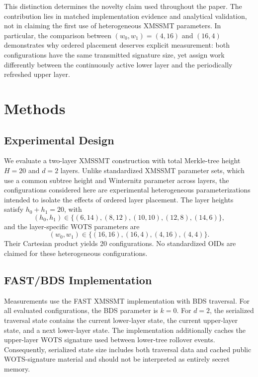 \documentclass[pdflatex,sn-mathphys-num]{sn-jnl}
\begin{document}
This distinction determines the novelty claim used throughout the paper.
The contribution lies in matched implementation evidence and analytical
validation, not in claiming the first use of heterogeneous XMSSMT
parameters. In particular, the comparison between $(w_0,w_1)=(4,16)$
and $(16,4)$ demonstrates why ordered placement deserves explicit
measurement: both configurations have the same transmitted signature
size, yet assign work differently between the continuously active lower
layer and the periodically refreshed upper layer.

\section{Methods}

\subsection{Experimental Design}
\label{sec:experimental_design}

We evaluate a two-layer XMSSMT construction with total Merkle-tree
height $H=20$ and $d=2$ layers. Unlike standardized XMSSMT parameter
sets, which use a common subtree height and Winternitz parameter across
layers, the configurations considered here are experimental
heterogeneous parameterizations intended to isolate the effects of
ordered layer placement. The layer heights satisfy
$h_0+h_1=20$, with
\[
(h_0,h_1)\in
\{(6,14),(8,12),(10,10),(12,8),(14,6)\},
\]
and the layer-specific WOTS parameters are
\[
(w_0,w_1)\in
\{(16,16),(16,4),(4,16),(4,4)\}.
\]
Their Cartesian product yields 20 configurations. No standardized OIDs
are claimed for these heterogeneous configurations.

\subsection{FAST/BDS Implementation}
\label{sec:fast_bds}

Measurements use the FAST XMSSMT implementation with BDS traversal.
For all evaluated configurations, the BDS parameter is $k=0$.
For $d=2$, the serialized traversal state contains the current
lower-layer state, the current upper-layer state, and a next
lower-layer state. The implementation additionally caches the
upper-layer WOTS signature used between lower-tree rollover events.
Consequently, serialized state size includes both traversal data and
cached public WOTS-signature material and should not be interpreted as
entirely secret memory.
\end{document}
